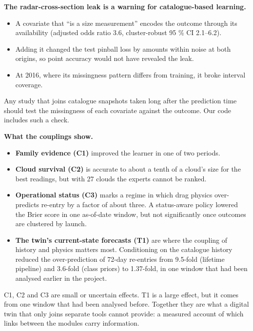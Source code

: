 \documentclass[
]{article}
\providecommand{\tightlist}{%
  \setlength{\itemsep}{0pt}\setlength{\parskip}{0pt}}
\begin{document}
\textbf{The radar-cross-section leak is a warning for catalogue-based
learning.}

\begin{itemize}
\tightlist
\item
  A covariate that ``is a size measurement'' encodes the outcome through
  its availability (adjusted odds ratio 3.6, cluster-robust 95 \% CI
  2.1--6.2).
\item
  Adding it changed the test pinball loss by amounts within noise at
  both origins, so point accuracy would not have revealed the leak.
\item
  At 2016, where its missingness pattern differs from training, it broke
  interval coverage.
\end{itemize}

Any study that joins catalogue snapshots taken long after the prediction
time should test the missingness of each covariate against the outcome.
Our code includes such a check.

\textbf{What the couplings show.}

\begin{itemize}
\tightlist
\item
  \textbf{Family evidence (C1)} improved the learner in one of two
  periods.
\item
  \textbf{Cloud survival (C2)} is accurate to about a tenth of a cloud's
  size for the best readings, but with 27 clouds the experts cannot be
  ranked.
\item
  \textbf{Operational status (C3)} marks a regime in which drag physics
  over-predicts re-entry by a factor of about three. A status-aware
  policy lowered the Brier score in one as-of-date window, but not
  significantly once outcomes are clustered by launch.
\item
  \textbf{The twin's current-state forecasts (T1)} are where the
  coupling of history and physics matters most. Conditioning on the
  catalogue history reduced the over-prediction of 72-day re-entries
  from 9.5-fold (lifetime pipeline) and 3.6-fold (class priors) to
  1.37-fold, in one window that had been analysed earlier in the
  project.
\end{itemize}

C1, C2 and C3 are small or uncertain effects. T1 is a large effect, but
it comes from one window that had been analysed before. Together they
are what a digital twin that only joins separate tools cannot provide: a
measured account of which links between the modules carry information.
\end{document}
